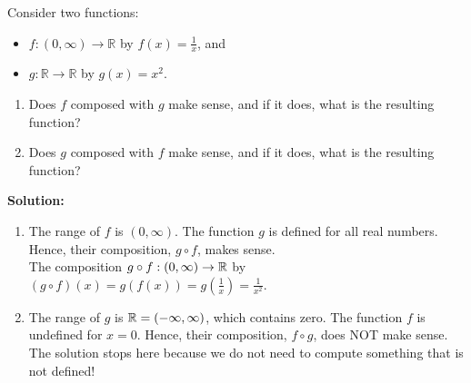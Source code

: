 \bigskip

\begin{example}
Consider two functions:
\begin{itemize}
    \item \( f: (0, \infty) \to \mathbb{R} \) by \( f(x) = \frac{1}{x} \), and 
    \item \( g: \mathbb{R} \to \mathbb{R} \) by \( g(x) = x^2 \).
\end{itemize}

\begin{enumerate}
\renewcommand{\labelenumi}{(\alph{enumi})}
\setlength{\itemsep}{.2cm}
    \item Does $f$ composed with $g$ make sense, and if it does, what is the resulting function?

    \item Does $g$ composed with $f$ make sense, and if it does, what is the resulting function?\\
\end{enumerate}

\end{example}

\textbf{Solution:} 

\begin{enumerate}
\renewcommand{\labelenumi}{(\alph{enumi})}
\setlength{\itemsep}{.2cm}
    \item The range of $f$ is $(0, \infty)$. The function $g$ is defined for all real numbers. Hence, their composition, $g \circ f$, makes sense.\\
    
The composition \( g \circ f:(0, \infty) \to \mathbb R \) by $(g \circ f)(x) = g(f(x)) = g\left(\frac{1}{x}\right) = \frac{1}{x^2}$.


    \item The range of $g$ is $\mathbb R = (-\infty, \infty)$, which contains zero. The function $f$ is undefined for $x = 0$. Hence, their composition, $f \circ g$, does NOT make sense. The solution stops here because we do not need to compute something that is not defined! \\   

\end{enumerate}

\bigskip 


